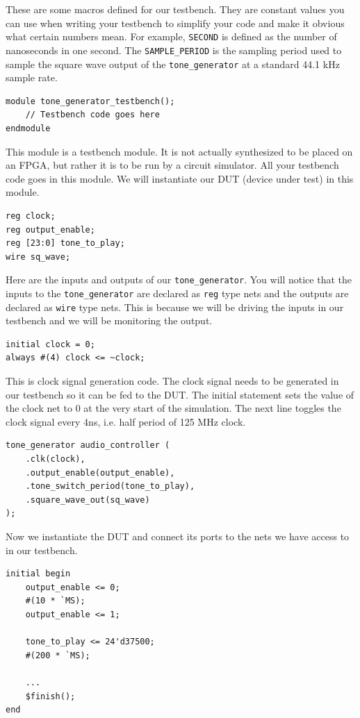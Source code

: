 \documentclass[11pt]{article}
\begin{document}
These are some macros defined for our testbench. They are constant values you can use when writing your testbench to simplify your code and make it obvious what certain numbers mean. For example, \verb|SECOND| is defined as the number of nanoseconds in one second. The \verb|SAMPLE_PERIOD| is the sampling period used to sample the square wave output of the \verb|tone_generator| at a standard 44.1 kHz sample rate.

\begin{verbatim}
module tone_generator_testbench();
	// Testbench code goes here
endmodule
\end{verbatim}

This module is a testbench module. It is not actually synthesized to be placed on an FPGA, but rather it is to be run by a circuit simulator. All your testbench code goes in this module. We will instantiate our DUT (device under test) in this module.

\begin{verbatim}
reg clock;
reg output_enable;
reg [23:0] tone_to_play;
wire sq_wave;
\end{verbatim}

Here are the inputs and outputs of our \verb|tone_generator|. You will notice that the inputs to the \verb|tone_generator| are declared as \verb|reg| type nets and the outputs are declared as \verb|wire| type nets. This is because we will be driving the inputs in our testbench and we will be monitoring the output.

\begin{verbatim}
initial clock = 0;
always #(4) clock <= ~clock;
\end{verbatim}

This is clock signal generation code. The clock signal needs to be generated in our testbench so it can be fed to the DUT. The initial statement sets the value of the clock net to 0 at the very start of the simulation. The next line toggles the clock signal every 4ns, i.e. half period of 125 MHz clock.

\begin{verbatim}
tone_generator audio_controller (
    .clk(clock),
    .output_enable(output_enable),
    .tone_switch_period(tone_to_play),
    .square_wave_out(sq_wave)
);
\end{verbatim}

Now we instantiate the DUT and connect its ports to the nets we have access to in our testbench.

\begin{verbatim}
initial begin
    output_enable <= 0;
    #(10 * `MS);
    output_enable <= 1;

    tone_to_play <= 24'd37500;
    #(200 * `MS);

    ...
    $finish();
end
\end{verbatim}
\end{document}

